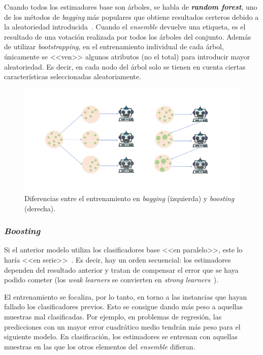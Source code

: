 Cuando todos los estimadores base son árboles, se habla de \textbf{\textit{random forest}}, uno de los métodos de \textit{bagging} más populares que obtiene resultados certeros debido a la aleatoriedad introducida~\cite{originalCoForest2007}. Cuando el \textit{ensemble} devuelve una etiqueta, es el resultado de una votación realizada por todos los árboles del conjunto. Además de utilizar \textit{bootstrapping}, en el entrenamiento individual de cada árbol, únicamente se <<ven>> algunos atributos (no el total) para introducir mayor aleatoriedad. Es decir, en cada nodo del árbol solo se tienen en cuenta ciertas características seleccionadas aleatoriamente.

\begin{figure}[h]
	\caption[Entrenamiento \textit{bagging} y \textit{boosting}]{Diferencias entre el entrenamiento en \textit{bagging} (izquierda) y \textit{boosting} (derecha).}
	\label{img:bagging}
	\centering
	\includegraphics[width=\textwidth]{../img/memoria/3_bagging_boosting}
\end{figure}
	
\subsubsection{\textit{Boosting}}

Si el anterior modelo utiliza los clasificadores base <<en paralelo>>, este lo haría <<en serie>>~\cite{engelen2018thesis}. Es decir, hay un orden secuencial: los estimadores dependen del resultado anterior y tratan de compensar el error que se haya podido cometer (los \textit{weak learners} se convierten en \textit{strong learners}~\cite{ensembles2006robi}).

El entrenamiento se focaliza, por lo tanto, en torno a las instancias que hayan fallado los clasificadores previos. Esto se consigue dando más peso a aquellas muestras mal clasificadas. Por ejemplo, en problemas de regresión, las predicciones con un mayor error cuadrático medio tendrán más peso para el siguiente modelo. En clasificación, los estimadores se entrenan con aquellas muestras en las que los otros elementos del \textit{ensemble} difieran.

